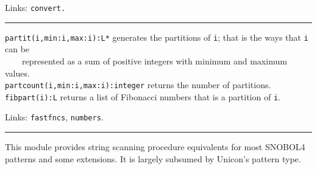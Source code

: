 Links: \texttt{convert.}

\vspace{0.25cm}\hrule{}

\texttt{partit(i,min:i,max:i):L*} generates the partitions of
\texttt{i}; that is the ways that \texttt{i} can be\\
 \ \ \ \ represented as a sum of positive integers with minimum
and maximum values.\\
\texttt{partcount(i,min:i,max:i):integer} returns the number of
partitions.\\
\texttt{fibpart(i):L} returns a list of Fibonacci numbers that is a
partition of \texttt{i}.

Links: \texttt{fastfncs}, \texttt{numbers}. 

\vspace{0.25cm}\hrule{}

This module provides string scanning procedure equivalents for most
SNOBOL4 patterns and some
extensions. %
It is largely subsumed by Unicon's pattern type.




